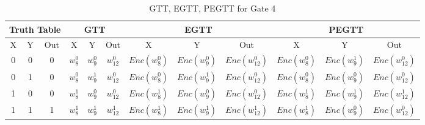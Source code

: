 \documentclass[times]{article}
\begin{document}
	\begin{table}
		\centering
		\caption{GTT, EGTT, PEGTT for Gate 4}
		\label{tab:gtt4}
		\begin{adjustbox}{width=1\textwidth}
		\begin{tabular}{|c|c|c||c|c|c||c|c|c||c|c|c|}
			\hline
			\multicolumn{3}{|c||}{Truth Table} 		& 
				\multicolumn{3}{|c||}{GTT}			& 
					\multicolumn{3}{|c||}{EGTT} 		& 
						\multicolumn{3}{|c|}{PEGTT} \\
			\hline
			\hline
			X & Y & Out	& 
				X & Y & Out	& 
					X & Y & Out	& 
						X & Y & Out	\\
			\hline
			0 & 0 & 0 	&
				$w_{8}^0$	& $w_{9}^0$	& $w_{12}^0$	& 
					$Enc(w_{8}^0)$	& $Enc(w_{9}^0)$	& $Enc(w_{12}^0)$ &
						$Enc(w_{8}^0)$	& $Enc(w_{9}^1)$	& $Enc(w_{12}^0)$ \\
			\hline
			0 & 1 & 0 	&
				$w_{8}^0$	& $w_{9}^1$	& $w_{12}^0$	& 
					$Enc(w_{8}^0)$	& $Enc(w_{9}^1)$	& $Enc(w_{12}^0)$ &
						$Enc(w_{8}^0)$	& $Enc(w_{9}^0)$	& $Enc(w_{12}^0)$ \\
			\hline
			1 & 0 & 0 	&
				$w_{8}^1$	& $w_{9}^0$	& $w_{12}^0$	& 
					$Enc(w_{8}^1)$	& $Enc(w_{9}^0)$	& $Enc(w_{12}^0)$ &
						$Enc(w_{8}^1)$	& $Enc(w_{9}^1)$	& $Enc(w_{12}^1)$ \\
			\hline
			1 & 1 & 1 	&
				$w_{8}^1$	& $w_{9}^1$	& $w_{12}^1$	& 
					$Enc(w_{8}^1)$	& $Enc(w_{9}^1)$	& $Enc(w_{12}^1)$ &
						$Enc(w_{8}^1)$	& $Enc(w_{9}^0)$	& $Enc(w_{12}^0)$ \\
			\hline
		\end{tabular}
		\end{adjustbox}
	\end{table}
\end{document}
